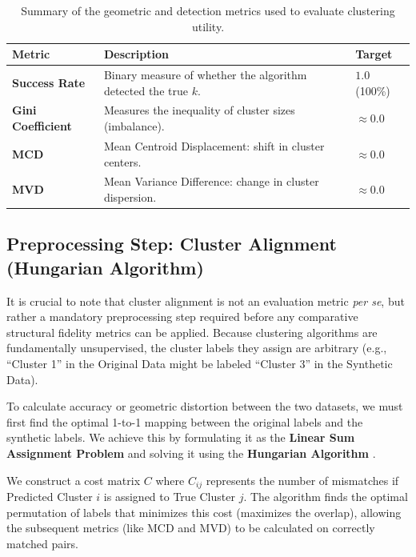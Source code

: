 \begin{table}[H]
  \centering
  \caption[Summary of Clustering Evaluation Metrics]{Summary of the geometric and detection metrics used to evaluate clustering utility.}
  \label{tab:clustering_metrics}
  \renewcommand{\arraystretch}{1.3}
  \begin{tabular}{@{}lp{8cm}l@{}}
    \toprule
    \textbf{Metric} & \textbf{Description} & \textbf{Target} \\ \midrule
    \textbf{Success Rate} & Binary measure of whether the algorithm detected the true $k$. & $1.0$ (100\%) \\
    \textbf{Gini Coefficient} & Measures the inequality of cluster sizes (imbalance). & $\approx 0.0$ \\
    \textbf{MCD} & Mean Centroid Displacement: shift in cluster centers. & $\approx 0.0$ \\
    \textbf{MVD} & Mean Variance Difference: change in cluster dispersion. & $\approx 0.0$ \\ \bottomrule
  \end{tabular}
\end{table}

\subsection{Preprocessing Step: Cluster Alignment (Hungarian Algorithm)}
It is crucial to note that cluster alignment is not an evaluation metric \textit{per se}, but rather a mandatory preprocessing step required before any comparative structural fidelity metrics can be applied. Because clustering algorithms are fundamentally unsupervised, the cluster labels they assign are arbitrary (e.g., ``Cluster 1'' in the Original Data might be labeled ``Cluster 3'' in the Synthetic Data).

To calculate accuracy or geometric distortion between the two datasets, we must first find the optimal 1-to-1 mapping between the original labels and the synthetic labels. We achieve this by formulating it as the \textbf{Linear Sum Assignment Problem} and solving it using the \textbf{Hungarian Algorithm} \cite{kuhn1955}.

We construct a cost matrix $C$ where $C_{ij}$ represents the number of mismatches if Predicted Cluster $i$ is assigned to True Cluster $j$. The algorithm finds the optimal permutation of labels that minimizes this cost (maximizes the overlap), allowing the subsequent metrics (like MCD and MVD) to be calculated on correctly matched pairs.

